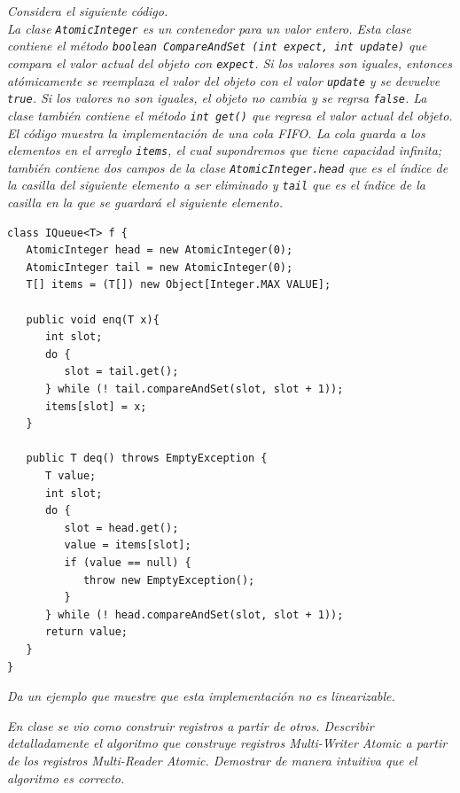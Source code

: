 \documentclass{article}
\begin{document}
\begin{enumerate}
{\item{\textsl{
      Considera el siguiente código.\\
      La clase \texttt{AtomicInteger} es un contenedor para un valor
      entero. Esta clase contiene el método \texttt{boolean
        CompareAndSet (int expect, int update)} que compara el valor
      actual del objeto con \texttt{expect}. Si los valores son
      iguales, entonces atómicamente se reemplaza el valor del objeto
      con el valor \texttt{update} y se devuelve \texttt{true}. Si los
      valores no son iguales, el objeto no cambia y se regrsa
      \texttt{false}. La clase también contiene el método \texttt{int
        get()} que regresa el valor actual del objeto.\\
      El código muestra la implementación de una cola FIFO. La cola
      guarda a los elementos en el arreglo \texttt{items}, el cual
      supondremos que tiene capacidad infinita; también contiene dos
      campos de la clase \texttt{AtomicInteger.head} que es el índice
      de la casilla del siguiente elemento a ser eliminado y
      \texttt{tail} que es el índice de la casilla en la que se
      guardará el siguiente elemento.
    }

    \renewcommand{\lstlistingname}{}
\begin{lstlisting}[frame=single]
class IQueue<T> f {
   AtomicInteger head = new AtomicInteger(0);
   AtomicInteger tail = new AtomicInteger(0);
   T[] items = (T[]) new Object[Integer.MAX VALUE];
   
   public void enq(T x){
      int slot;
      do {
         slot = tail.get();
      } while (! tail.compareAndSet(slot, slot + 1));
      items[slot] = x;
   }

   public T deq() throws EmptyException {
      T value;
      int slot;
      do {
         slot = head.get();
         value = items[slot];
         if (value == null) {
            throw new EmptyException();
         }
      } while (! head.compareAndSet(slot, slot + 1));
      return value;
   }
}
\end{lstlisting}
    \textsl{Da un ejemplo que muestre que esta implementación no es
      linearizable.}

  }
}

\item{\textsl {
      En clase se vio como construir registros a partir de
      otros. Describir detalladamente el algoritmo que construye
      registros Multi-Writer Atomic a partir de los registros
      Multi-Reader Atomic. Demostrar de manera intuitiva que el
      algoritmo es correcto.\\
    }
    
}
\end{enumerate}
\end{document}
